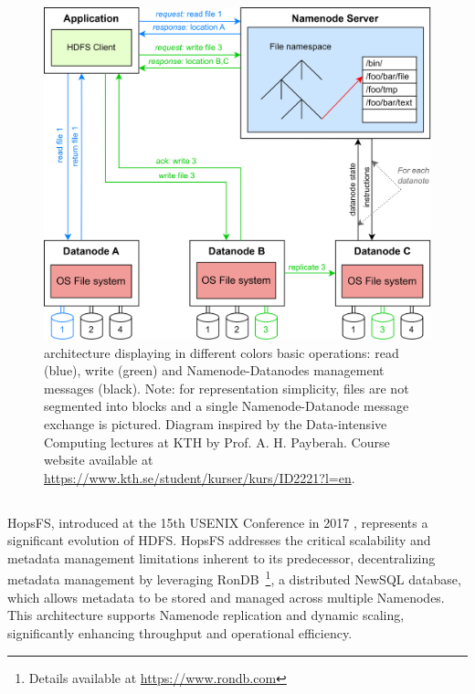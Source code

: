\begin{figure}[!ht]
    \begin{center}
      \includegraphics[width=\textwidth]{figures/2-background_and_related_work/hdfs_schema.png}
    \end{center}
    \caption[Hadoop Distributed File System architecture]{ architecture displaying in different colors basic operations: read (blue), write (green) and Namenode-Datanodes management messages (black). Note: for representation simplicity, files are not segmented into blocks and a single Namenode-Datanode message exchange is pictured. Diagram inspired by the Data-intensive Computing lectures at KTH by Prof. A. H. Payberah. Course website available at \url{https://www.kth.se/student/kurser/kurs/ID2221?l=en}.}
    \label{fig:hdfs_schema}
\end{figure}

\subsection{}

\gls{HopsFS}, introduced at the 15th USENIX Conference in 2017 \cite{niaziHopsFSScalingHierarchical2017}, represents a significant evolution of \gls{HDFS}. \gls{HopsFS} addresses the critical scalability and metadata management limitations inherent to its predecessor, decentralizing metadata management by leveraging RonDB~\footnote{Details available at \url{https://www.rondb.com}}, a distributed NewSQL database, which allows metadata to be stored and managed across multiple Namenodes. This architecture supports Namenode replication and dynamic scaling, significantly enhancing throughput and operational efficiency.

